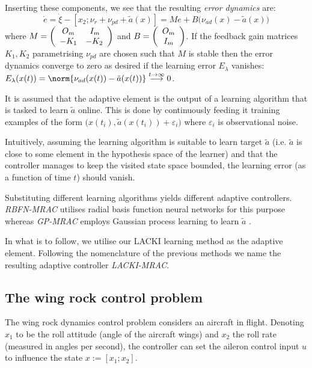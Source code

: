 Inserting these components, we see that the resulting \textit{error dynamics} are:
%
%
\begin{equation}\label{eq:errordynmrac}
	\dot e = \dot \xi - [x_2; \nu_r + \nu_{pd}+ \tilde a(x) ] = M e + B \bigl(\nu_{ad}(x) -  \tilde a(x)\bigr)
\end{equation}
%
%
where $M = \left(\begin{array}[h]{cc}
			O_m &  \, I_{m}\\
			-K_1 & -K_2 
					\end{array}\right)$ and $B = \left(\begin{array}[h]{c}
			O_m \\ I_m
					\end{array}\right)$.
If the feedback gain matrices $K_1,K_2$ parametrising $\nu_{pd}$ are chosen such that $M$ is stable then the error dynamics converge to zero as desired if the learning error $E_\lambda$ vanishes: $E_\lambda (x(t)) = \norm{\nu_{ad}(x(t)) - \tilde a(x(t))} \stackrel{t \to \infty} {\longrightarrow} 0$. 

It is assumed that the adaptive element is the output of a learning algorithm that is tasked to learn $\tilde a$ online. This is done by continuously feeding it training examples of the form $\bigl(x(t_i), \tilde a(x(t_i)) + \varepsilon_i\bigr)$ where $\varepsilon_i$ is observational noise.  

Intuitively, assuming the learning algorithm is suitable to learn target $\tilde a$ (i.e. $\tilde a$ is close to some element in the hypothesis space \cite{mitchellbook:97} of the learner) and that the controller manages to keep the visited state space bounded, the learning error (as a function of time $t$) should vanish.

Substituting different learning algorithms yields different adaptive controllers. \textit{RBFN-MRAC} \cite{Kim1998} utilises radial basis function neural networks for this purpose whereas \textit{GP-MRAC} 
employs Gaussian process learning \cite{GPbook:2006} to learn $\tilde a$ \cite{Chowdhary2013,ChowdharyCDC2013}. 

In what is to follow, we utilise our LACKI learning method as the adaptive element. Following the nomenclature of the previous methods we name the resulting adaptive controller \textit{LACKI-MRAC}.

\subsection{The wing rock control problem}
The wing rock dynamics control problem considers an aircraft in flight. Denoting $x_1$ to be the roll attitude (angle of the aircraft wings) and $x_2$ the roll rate (measured in angles per second), the controller can set the aileron control input $u$ to influence the state $x := [x_1;x_2]$.

